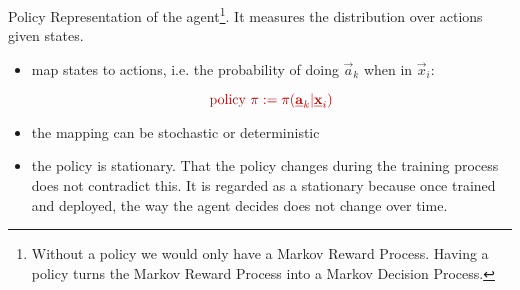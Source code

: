 \begin{frame}

\begin{block}{\textcolor{policy}{Policy}}
Representation of the agent\footnote{
Without a policy we would only have a Markov Reward Process.
Having a policy turns the Markov Reward Process into a Markov Decision Process.
}. It measures the distribution over actions given states.
\begin{itemize}
\item map states to actions, i.e. the probability of doing $\vec a_k$ when in $\vec x_i$:

\begin{equation}
\color{policy}
\text{policy }\pi := \pi(\vec a_k | \vec x_i)
\end{equation}
\item the mapping can be stochastic or deterministic
\item the policy is stationary. That the policy changes during the training process does not contradict this.
It is regarded as a stationary because once trained and deployed, the way the agent decides does not change over time.
\end{itemize}

\end{block}

\end{frame}

